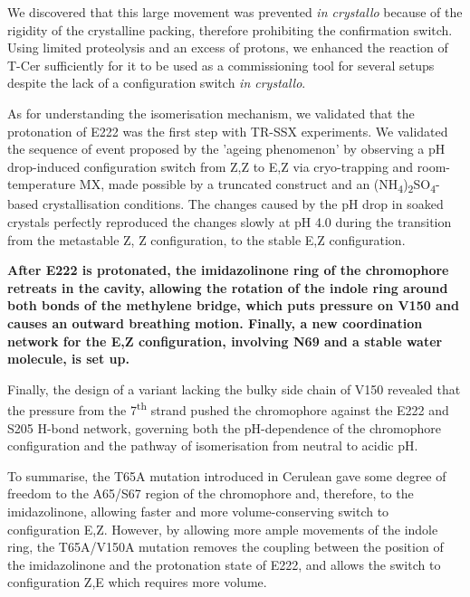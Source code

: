 We discovered that this large movement was prevented \textit{in crystallo} because of the rigidity of the crystalline packing, therefore prohibiting the confirmation switch. Using limited proteolysis and an excess of protons, we enhanced the reaction of T-Cer sufficiently for it to be used as a commissioning tool for several setups despite the lack of a configuration switch \textit{in crystallo}.  

As for understanding the isomerisation mechanism, we validated that the protonation of E222 was the first step with TR-SSX experiments. We validated the sequence of event proposed by the 'ageing phenomenon' by observing a pH drop-induced configuration switch from Z,Z to E,Z via cryo-trapping and room-temperature MX, made possible by a truncated construct and an (NH\textsubscript{4})\textsubscript{2}SO\textsubscript{4}-based crystallisation conditions. The changes caused by the pH drop in soaked crystals perfectly reproduced the changes slowly at pH 4.0 during the transition from the metastable Z, Z configuration, to the stable E,Z configuration.

\vspace{2mm}

\textbf{After E222 is protonated, the imidazolinone ring  of the chromophore retreats in the cavity, allowing the rotation of the indole ring around both bonds of the methylene bridge, which puts pressure on V150 and causes an outward breathing motion. Finally, a new coordination network for the E,Z configuration, involving N69 and a stable water molecule, is set up.}

Finally, the design of a variant lacking the bulky side chain of V150 revealed that the pressure from the 7\textsuperscript{th} strand pushed the chromophore against the E222 and S205 H-bond network, governing both the pH-dependence of the chromophore configuration and the pathway of isomerisation from neutral to acidic pH. 

\vspace{2mm}

To summarise, the T65A mutation introduced in Cerulean gave some degree of freedom to the A65/S67 region of the chromophore and, therefore, to the imidazolinone, allowing faster and more volume-conserving switch to configuration E,Z. However, by allowing more ample movements of the indole ring, the T65A/V150A mutation removes the coupling between the position of the imidazolinone and the protonation state of E222, and allows the switch to configuration Z,E which requires more volume. 

